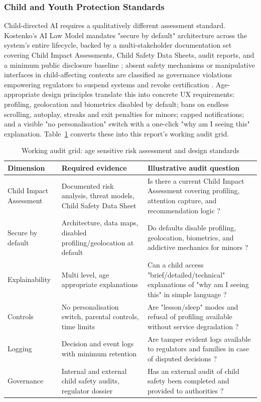 \documentclass[11pt]{article}
\begin{document}
\subsubsection{Child and Youth Protection Standards}
\label{sec:child_youth_protection} Child-directed AI requires a qualitatively different assessment standard. Kostenko's AI Law Model mandates "secure by default" architecture across the system's entire lifecycle, backed by a multi-stakeholder documentation set covering Child Impact Assessments, Child Safety Data Sheets, audit reports, and a minimum public disclosure baseline \parencites[214]{2977039}; absent safety mechanisms or manipulative interfaces in child-affecting contexts are classified as governance violations empowering regulators to suspend systems and revoke certification \parencites[223]{2977039}. Age-appropriate design principles translate this into concrete UX requirements: profiling, geolocation and biometrics disabled by default; bans on endless scrolling, autoplay, streaks and exit penalties for minors; capped notifications; and a visible "no personalisation" switch with a one-click "why am I seeing this" explanation. Table~\ref{tab:child_risk_design} converts these into this report's working audit grid.

\begin{table}[H] \centering \caption{Working audit grid: age sensitive risk assessment and design standards} \label{tab:child_risk_design} \begin{tabular}{p{3.2cm}p{4.4cm}p{4.4cm}} \hline Dimension & Required evidence & Illustrative audit question \\ \hline Child Impact Assessment & Documented risk analysis, threat models, Child Safety Data Sheet & Is there a current Child Impact Assessment covering profiling, attention capture, and recommendation logic \parencites[214]{2977039}? \\ Secure by default & Architecture, data maps, disabled profiling/geolocation at default & Do defaults disable profiling, geolocation, biometrics, and addictive mechanics for minors \parencites[223]{2977039}? \\ Explainability & Multi level, age appropriate explanations & Can a child access "brief/detailed/technical" explanations of "why am I seeing this" in simple language \parencites[214]{2977039}[223]{2977039}? \\ Controls & No personalisation switch, parental controls, time limits & Are "lesson/sleep" modes and refusal of profiling available without service degradation \parencites[223]{2977039}? \\ Logging & Decision and event logs with minimum retention & Are tamper evident logs available to regulators and families in case of disputed decisions \parencites[214]{2977039}[191]{2977039}? \\ Governance & Internal and external child safety audits, regulator dossier & Has an external audit of child safety been completed and provided to authorities \parencites[214]{2977039}? \\ \hline \end{tabular} \end{table}
\end{document}
